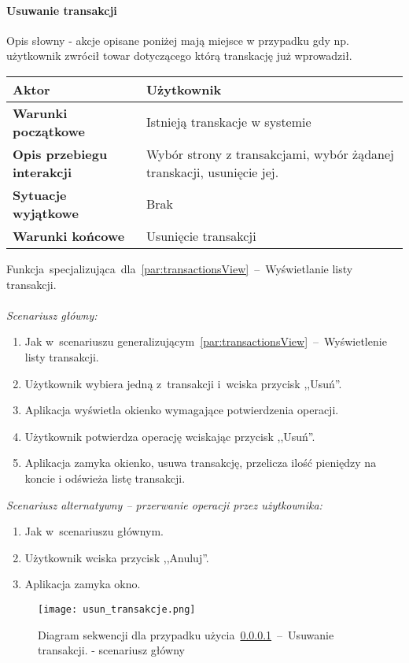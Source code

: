 \paragraph{Usuwanie transakcji\newline}
\label{par:transactionDelete}
Opis słowny - akcje opisane poniżej mają miejsce w przypadku gdy np. użytkownik zwrócił
towar dotyczącego którą transkację już wprowadził.
\begin{longtable}{|p{5cm}|p{7cm}|}
 	\hline
	\textbf{Aktor} & Użytkownik \\
	\hline
	\textbf{Warunki początkowe} & Istnieją transkacje w systemie
	\\
	\hline
	\textbf{Opis przebiegu interakcji} & Wybór strony z transakcjami, wybór żądanej transkacji,
	usunięcie jej.
	\\
	\hline
	\textbf{Sytuacje wyjątkowe} & Brak
	\\
	\hline
	\textbf{Warunki końcowe} & Usunięcie transakcji
	\\
	\hline
 \end{longtable}
Funkcja~specjalizująca~dla~\ref{par:transactionsView}~--~Wyświetlanie listy transakcji.\\\\
\textit{Scenariusz główny:}
\begin{enumerate}
  \item[1-3.] Jak w~scenariuszu generalizującym~\ref{par:transactionsView}~--~Wyświetlenie listy transakcji.
  \item[4.] Użytkownik wybiera jedną z~transakcji i~wciska przycisk ,,Usuń''.
  \item[5.] Aplikacja wyświetla okienko wymagające potwierdzenia operacji.
  \item[6.] Użytkownik potwierdza operację wciskając przycisk ,,Usuń''.
  \item[7.] Aplikacja zamyka okienko, usuwa transakcję, przelicza ilość pieniędzy na koncie i odświeża listę transakcji.
\end{enumerate}
\textit{Scenariusz alternatywny -- przerwanie operacji przez użytkownika:}
\begin{enumerate}
  \item[1-5.] Jak w~scenariuszu głównym.
  \item[6.] Użytkownik wciska przycisk ,,Anuluj''.
  \item[7.] Aplikacja zamyka okno.
\end{enumerate}

\begin{figure}[H]
    \texttt{[image: usun\_transakcje.png]}
    \caption{Diagram sekwencji dla przypadku użycia~\ref{par:transactionDelete}~--~Usuwanie transakcji.
    - scenariusz główny}
\end{figure}


